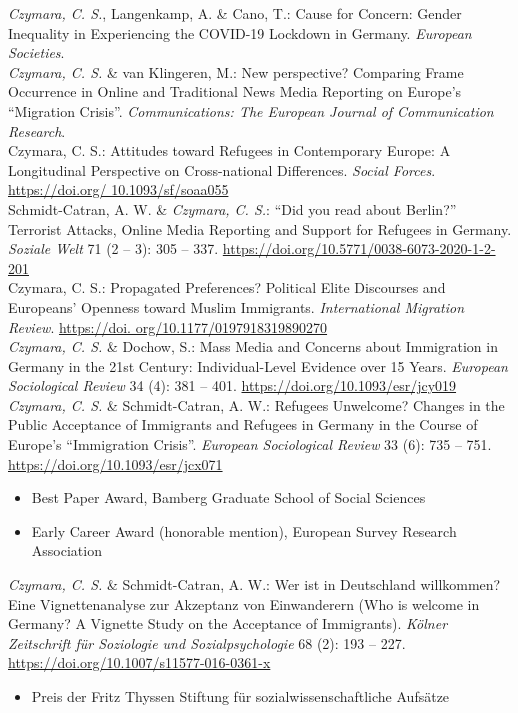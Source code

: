 \documentclass[11pt, a4paper]{article}
\newcommand{\years}[1]{\marginnote{~~#1}}
\begin{document}
\years{2020}\textit{Czymara, C. S.}, Langenkamp, A. \& Cano, T.: Cause for Concern: Gender Inequality in Experiencing the COVID-19 Lockdown in Germany. \textit{European Societies}.\\
\textit{Czymara, C. S.} \& van Klingeren, M.: New perspective? Comparing Frame Occurrence in Online and Traditional News Media Reporting on Europe's ``Migration Crisis''. \textit{Communications: The European Journal of Communication Research}.\\
Czymara, C. S.: Attitudes toward Refugees in Contemporary Europe: A Longitudinal Perspective on Cross-national Differences. \textit{Social Forces}. \href{https://doi.org/10.1093/sf/soaa055}{https://doi.org/ 10.1093/sf/soaa055}\\
Schmidt-Catran, A. W. \& \textit{Czymara, C. S.}: ``Did you read about Berlin?'' Terrorist Attacks, Online Media Reporting and Support for Refugees in Germany. \textit{Soziale Welt} 71 (2 -- 3): 305 -- 337. \href{https://doi.org/10.5771/0038-6073-2020-1-2-201}{https://doi.org/10.5771/0038-6073-2020-1-2-201}\\
\years{2019}Czymara, C. S.: Propagated Preferences? Political Elite Discourses and Europeans’ Openness toward Muslim Immigrants. \textit{International Migration Review}. \href{https://doi.org/10.1177/0197918319890270}{https://doi. org/10.1177/0197918319890270}\\
\years{2018}\textit{Czymara, C. S.} \& Dochow, S.: Mass Media and Concerns about Immigration in Germany in the 21st Century: Individual-Level Evidence over 15 Years. \textit{European Sociological Review} 34 (4): 381 -- 401. \href{https://doi.org/10.1093/esr/jcy019}{https://doi.org/10.1093/esr/jcy019}\\
\years{2017}\textit{Czymara, C. S.} \& Schmidt-Catran, A. W.: Refugees Unwelcome? Changes in the Public Acceptance of Immigrants and Refugees in Germany in the Course of Europe's ``Immigration Crisis''. \textit{European Sociological Review} 33 (6): 735 -- 751. \href{https://doi.org/10.1093/esr/jcx071}{https://doi.org/10.1093/esr/jcx071}
\begin{itemize}[noitemsep,nolistsep]
	\item Best Paper Award, Bamberg Graduate School of Social Sciences
	\item Early Career Award (honorable mention), European Survey Research Association
\end{itemize}
\years{2016}\textit{Czymara, C. S.} \& Schmidt-Catran, A. W.: Wer ist in Deutschland willkommen? Eine Vignettenanalyse zur Akzeptanz von Einwanderern (Who is welcome in Germany? A Vignette Study on the Acceptance of Immigrants). \textit{K\"olner Zeitschrift f\"ur Soziologie und Sozialpsychologie} 68 (2): 193 -- 227. \href{https://doi.org/10.1007/s11577-016-0361-x}{https://doi.org/10.1007/s11577-016-0361-x}
\begin{itemize}[nolistsep]
	\item Preis der Fritz Thyssen Stiftung für sozialwissenschaftliche Aufsätze
\end{itemize}
\hspace{1em}
\end{document}
